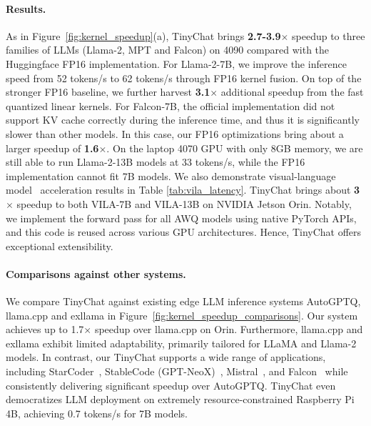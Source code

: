 \paragraph{Results.} As in Figure~\ref{fig:kernel_speedup}(a), TinyChat brings \textbf{2.7-3.9$\times$} speedup to three families of LLMs (Llama-2, MPT and Falcon) on 4090 compared with the Huggingface FP16 implementation. For Llama-2-7B, we improve the inference speed from 52 tokens/s to 62 tokens/s through FP16 kernel fusion. On top of the stronger FP16 baseline, we further harvest \textbf{3.1$\times$} additional speedup from the fast quantized linear kernels. For Falcon-7B, the official implementation did not support KV cache correctly during the inference time, and thus it is significantly slower than other models. In this case, our FP16 optimizations bring about a larger speedup of \textbf{1.6$\times$}. On the laptop 4070 GPU with only 8GB memory, we are still able to run Llama-2-13B models at 33 tokens/s, while the FP16 implementation cannot fit 7B models. We also demonstrate visual-language model~\cite{lin2023vila} acceleration results in Table \ref{tab:vila_latency}. TinyChat brings about \textbf{3$\times$} speedup to both VILA-7B and VILA-13B on NVIDIA Jetson Orin. Notably, we implement the forward pass for all AWQ models using native PyTorch APIs, and this code is reused across various GPU architectures. Hence, TinyChat offers exceptional extensibility. 

\paragraph{Comparisons against other systems.} We compare TinyChat against existing edge LLM inference systems AutoGPTQ, llama.cpp and exllama in Figure~\ref{fig:kernel_speedup_comparisons}. Our system achieves up to 1.7$\times$ speedup over llama.cpp on Orin. Furthermore, llama.cpp and exllama exhibit limited adaptability, primarily tailored for LLaMA and Llama-2 models. In contrast, our TinyChat supports a wide range of applications, including StarCoder~\cite{li2023starcoder}, StableCode (GPT-NeoX)~\cite{black2022gpt}, Mistral~\cite{jiang2023mistral}, and Falcon~\cite{penedo2023refinedweb} while consistently delivering significant speedup over AutoGPTQ. TinyChat even democratizes LLM deployment on extremely resource-constrained Raspberry Pi 4B, achieving 0.7 tokens/s for 7B models. 

